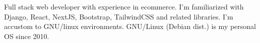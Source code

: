 


\begin{cvpubs}

  \cvpub
    {
      \begin{cvlist}
  \item { Full stack web developer with experience in ecommerce. I'm familiarized with Django, React, NextJS, Bootstrap, TailwindCSS and related libraries. I'm accustom to GNU/linux environments. GNU/Linux (Debian dist.) is my personal OS since 2010. }
      \end{cvlist}
    }\vspace{-15pt}
\end{cvpubs}
